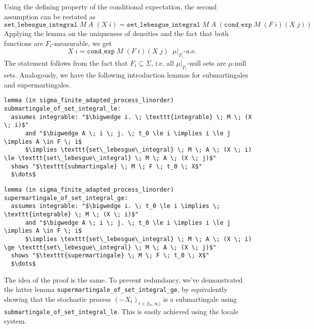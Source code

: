 Using the defining property of the conditional expectation, the second assumption can be restated as
\[
	\texttt{set\_lebesgue\_integral} \; M \; A \; (X \; i) = \texttt{set\_lebesgue\_integral} \; M \; A \; (\texttt{cond\_exp} \; M \; (F \; i) (X \; j))
\]
Applying the lemma on the uniqueness of densities and the fact that both functions are $F_i$-measurable, we get
\[
	\quad X \; i = \texttt{cond\_exp} \; M \; (F \; i) (X \; j) \;\; \mu\vert_{F_i}\textrm{-a.e.}
\]
The statement follows from the fact that $F_i \subseteq \Sigma$, i.e. all $\mu\vert_{F_i}$-null sets are $\mu$-null sets. Analogously, we have the following introduction lemmas for submartingales and supermartingales.

\begin{isalemma}
{\small
\begin{lstlisting}[style=isabelle]
lemma (in sigma_finite_adapted_process_linorder) submartingale_of_set_integral_le:
  assumes integrable: "$\bigwedge i. \; \texttt{integrable} \; M \; (X \; i)$"
      and "$\bigwedge A \; i \; j. \; t_0 \le i \implies i \le j \implies A \in F \; i$
	  $\implies \texttt{set\_lebesgue\_integral} \; M \; A \; (X \; i) \le \texttt{set\_lebesgue\_integral} \; M \; A \; (X \; j)$" 
  shows "$\texttt{submartingale} \; M \; F \; t_0 \; X$"
  $\dots$
\end{lstlisting}
}
\end{isalemma}

\begin{isalemma}
{\small
\begin{lstlisting}[style=isabelle]
lemma (in sigma_finite_adapted_process_linorder) supermartingale_of_set_integral_ge:
  assumes integrable: "$\bigwedge i. \; t_0 \le i \implies \; \texttt{integrable} \; M \; (X \; i)$"
      and "$\bigwedge A \; i \; j. \; t_0 \le i \implies i \le j \implies A \in F \; i$
	  $\implies \texttt{set\_lebesgue\_integral} \; M \; A \; (X \; i) \ge \texttt{set\_lebesgue\_integral} \; M \; A \; (X \; j)$" 
  shows "$\texttt{supermartingale} \; M \; F \; t_0 \; X$"
  $\dots$
\end{lstlisting}
}
\end{isalemma}

The idea of the proof is the same. To prevent redundancy, we've demonstrated the latter lemma \texttt{supermartingale\_of\_set\_integral\_ge}, by equivalently showing that the stochastic process $(-X_t)_{t \in [t_0,\infty)}$ is a submartingale using \texttt{submartingale\_of\_set\_integ\-ral\_le}. This is easily achieved using the locale system.

